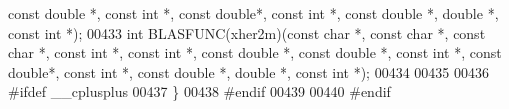 \begin{DoxyCode}
{      const} \textcolor{keywordtype}{double} *, \textcolor{keyword}{const} \textcolor{keywordtype}{int} *, \textcolor{keyword}{const} \textcolor{keywordtype}{double}*, \textcolor{keyword}{const} \textcolor{keywordtype}{int} *, \textcolor{keyword}{const} \textcolor{keywordtype}{double} *, \textcolor{keywordtype}{double} *, \textcolor{keyword}{const} \textcolor{keywordtype}{int} *);
00433 \textcolor{keywordtype}{int} BLASFUNC(xher2m)(\textcolor{keyword}{const} \textcolor{keywordtype}{char} *, \textcolor{keyword}{const} \textcolor{keywordtype}{char} *, \textcolor{keyword}{const} \textcolor{keywordtype}{char} *, \textcolor{keyword}{const} \textcolor{keywordtype}{int} *, \textcolor{keyword}{const} \textcolor{keywordtype}{int} *, \textcolor{keyword}{const} \textcolor{keywordtype}{double} *, \textcolor{keyword}{
      const} \textcolor{keywordtype}{double} *, \textcolor{keyword}{const} \textcolor{keywordtype}{int} *, \textcolor{keyword}{const} \textcolor{keywordtype}{double}*, \textcolor{keyword}{const} \textcolor{keywordtype}{int} *, \textcolor{keyword}{const} \textcolor{keywordtype}{double} *, \textcolor{keywordtype}{double} *, \textcolor{keyword}{const} \textcolor{keywordtype}{int} *);
00434 
00435 
00436 \textcolor{preprocessor}{#ifdef \_\_cplusplus}
00437 \}
00438 \textcolor{preprocessor}{#endif}
00439 
00440 \textcolor{preprocessor}{#endif}
\end{DoxyCode}
